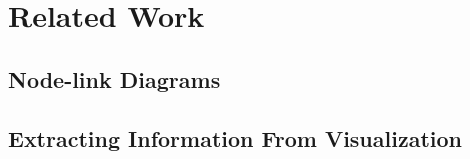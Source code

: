 \section{Related Work}\label{sec:relatedwork}
\subsection{Node-link Diagrams}
\subsection{Extracting Information From Visualization}





